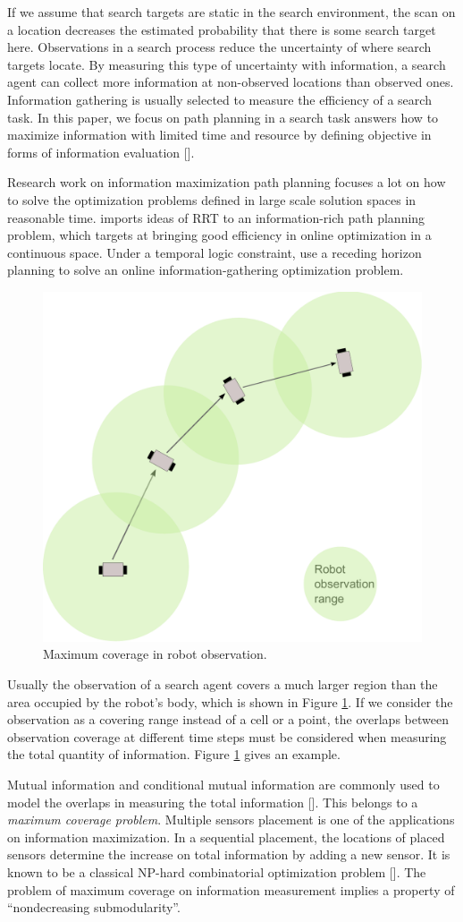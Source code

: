 \documentclass[12pt]{article}
\begin{document}
If we assume that search targets are static in the search environment, the scan on a location decreases the estimated probability that there is some search target here.
Observations in a search process reduce the uncertainty of where search targets locate.
By measuring this type of uncertainty with information, a search agent can collect more information at non-observed locations than observed ones.
Information gathering is usually selected to measure the efficiency of a search task.
In this paper, we focus on path planning in a search task answers how to maximize information with limited time and resource by defining objective in forms of information evaluation [\cite{goodrich2013toward}].

Research work on information maximization path planning focuses a lot on how to solve the optimization problems defined in large scale solution spaces in reasonable time.
\cite{levine2010information} imports ideas of RRT to an information-rich path planning problem, which targets at bringing good efficiency in online optimization in a continuous space.
Under a temporal logic constraint, \cite{JonesSchwagerBeltaICRA13scLTLInfo} use a receding horizon planning to solve an online information-gathering optimization problem.

\begin{figure}
\centering
\includegraphics[width=0.4\linewidth]{./images/robotObservation.pdf}
\caption{Maximum coverage in robot observation.}
\label{fig:robotObservation}
\end{figure}

Usually the observation of a search agent covers a much larger region than the area occupied by the robot's body, which is shown in Figure \ref{fig:robotObservation}.
If we consider the observation as a covering range instead of a cell or a point, the overlaps between observation coverage at different time steps must be considered when measuring the total quantity of information.
Figure \ref{fig:robotObservation} gives an example.

Mutual information and conditional mutual information are commonly used to model the overlaps in measuring the total information [\cite{singh2009efficient}].
This belongs to a \emph{maximum coverage problem}. 
Multiple sensors placement is one of the applications on information maximization.
In a sequential placement, the locations of placed sensors determine the increase on total information by adding a new sensor.
It is known to be a classical NP-hard combinatorial optimization problem [\cite{megiddo1983maximum}].
The problem of maximum coverage on information measurement implies a property of ``nondecreasing submodularity''. 
\end{document}
